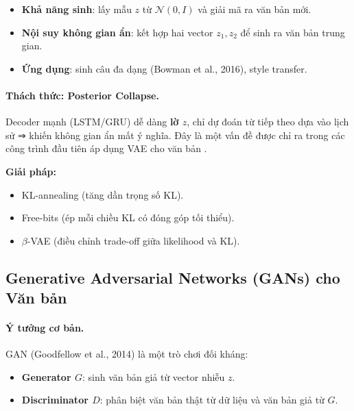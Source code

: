 \begin{tcolorbox}[title={Ưu điểm của VAE cho văn bản}, colback=purple!5!white, colframe=purple!75!black, fonttitle=\bfseries]
\begin{itemize}
    \item \textbf{Khả năng sinh}: lấy mẫu $z$ từ $\mathcal{N}(0,I)$ và giải mã ra văn bản mới.  
    \item \textbf{Nội suy không gian ẩn}: kết hợp hai vector $z_1, z_2$ để sinh ra văn bản trung gian.  
    \item \textbf{Ứng dụng}: sinh câu đa dạng (Bowman et al., 2016), style transfer.  
\end{itemize}
\end{tcolorbox}

\paragraph{Thách thức: Posterior Collapse.}  
Decoder mạnh (LSTM/GRU) dễ dàng \textbf{lờ $z$}, chỉ dự đoán từ tiếp theo dựa vào lịch sử ⇒ khiến không gian ẩn mất ý nghĩa. Đây là một vấn đề được chỉ ra trong các công trình đầu tiên áp dụng VAE cho văn bản \cite{bowman2015generating}.

\textbf{Giải pháp:}
\begin{itemize}
    \item KL-annealing (tăng dần trọng số KL).  
    \item Free-bits (ép mỗi chiều KL có đóng góp tối thiểu).  
    \item $\beta$-VAE (điều chỉnh trade-off giữa likelihood và KL).  
\end{itemize}

\subsection{Generative Adversarial Networks (GANs) cho Văn bản}
\label{ssec:gan_for_text}

\paragraph{Ý tưởng cơ bản.}  
GAN (Goodfellow et al., 2014) \cite{goodfellow2014generative} là một trò chơi đối kháng:
\begin{itemize}
    \item \textbf{Generator $G$}: sinh văn bản giả từ vector nhiễu $z$.  
    \item \textbf{Discriminator $D$}: phân biệt văn bản thật từ dữ liệu và văn bản giả từ $G$.  
\end{itemize}

